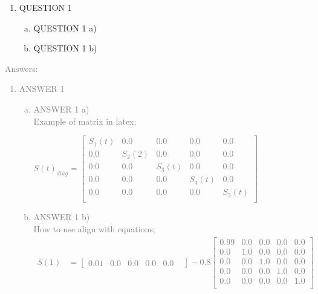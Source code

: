 \documentclass[11pt]{article}
\begin{document}
\begin{enumerate}
	\item QUESTION 1
		\begin{enumerate}[(a)]
		\item QUESTION 1 a)
		\item QUESTION 1 b)
	\end{enumerate}
\end{enumerate}
\textcolor{gray}{
Answers:
\begin{enumerate}
	\item ANSWER 1 \\
		\begin{enumerate}[(a)]
			\item ANSWER 1 a)\\
			Example of matrix in latex;\\
			\begin{center}
			 	$S(t)_{diag}=\begin{bmatrix} 
					S_1(t)  & 0.0 & 0.0 & 0.0 & 0.0 \\
					0.0  & S_2(2) & 0.0 & 0.0   & 0.0 \\
					0.0  & 0.0 & S_3(t) & 0.0 & 0.0 \\
					0.0  & 0 .0 & 0.0 & S_4(t) & 0.0 \\
					0.0  & 0 .0 & 0.0 & 0.0 & S_5(t) \\
				\end{bmatrix}$
			\end{center}
			\item ANSWER 1 b)\\
			How to use align with equations;\\
			\begin{align*}
				S(1) &=
					\begin{bmatrix} 
					0.01   &
					0.0 	&
					0.0 	&
					0.0 	&
					0.0 	&
					\end{bmatrix}
					 - 0.8 
					\begin{bmatrix} 
					0.99  & 0.0 & 0.0 & 0.0 & 0.0 \\
					0.0  & 1.0 & 0.0 & 0.0   & 0.0 \\
					0.0  & 0.0 & 1.0 & 0.0 & 0.0 \\
					0.0  & 0 .0 & 0.0 & 1.0 & 0.0 \\
					0.0  & 0 .0 & 0.0 & 0.0 & 1.0 \\
					\end{bmatrix}
			\end{align*}
		\end{enumerate}
\end{enumerate}
}
\end{document}
